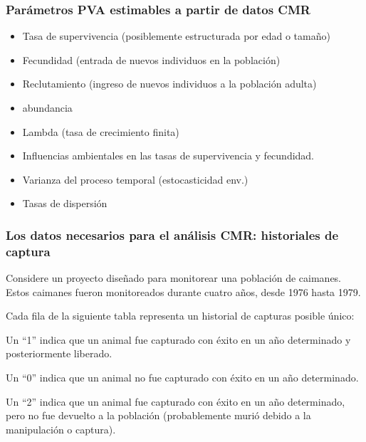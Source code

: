 \documentclass[
]{article}
\providecommand{\tightlist}{%
  \setlength{\itemsep}{0pt}\setlength{\parskip}{0pt}}
\begin{document}
\hypertarget{paruxe1metros-pva-estimables-a-partir-de-datos-cmr}{%
\subsubsection{Parámetros PVA estimables a partir de datos
CMR}\label{paruxe1metros-pva-estimables-a-partir-de-datos-cmr}}

\begin{itemize}
\tightlist
\item
  Tasa de supervivencia (posiblemente estructurada por edad o tamaño)
\item
  Fecundidad (entrada de nuevos individuos en la población)
\item
  Reclutamiento (ingreso de nuevos individuos a la población adulta)
\item
  abundancia
\item
  Lambda (tasa de crecimiento finita)
\item
  Influencias ambientales en las tasas de supervivencia y fecundidad.
\item
  Varianza del proceso temporal (estocasticidad env.)
\item
  Tasas de dispersión
\end{itemize}

\hypertarget{los-datos-necesarios-para-el-anuxe1lisis-cmr-historiales-de-captura}{%
\subsubsection{Los datos necesarios para el análisis CMR: historiales de
captura}\label{los-datos-necesarios-para-el-anuxe1lisis-cmr-historiales-de-captura}}

Considere un proyecto diseñado para monitorear una población de
caimanes. Estos caimanes fueron monitoreados durante cuatro años, desde
1976 hasta 1979.

Cada fila de la siguiente tabla representa un historial de capturas
posible único:

Un ``1'' indica que un animal fue capturado con éxito en un año
determinado y posteriormente liberado.

Un ``0'' indica que un animal no fue capturado con éxito en un año
determinado.

Un ``2'' indica que un animal fue capturado con éxito en un año
determinado, pero no fue devuelto a la población (probablemente murió
debido a la manipulación o captura).
\end{document}
